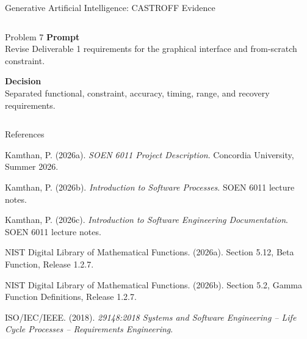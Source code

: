 \documentclass[aspectratio=169,10pt]{beamer}
\begin{document}
\begin{frame}[t]{Generative Artificial Intelligence: CASTROFF Evidence}
\begin{columns}[T,onlytextwidth]
    \begin{block}{Problem 7}
      \scriptsize
      \textbf{Prompt}\\
      Revise Deliverable 1 requirements for the graphical interface and
      from-scratch constraint.

      \vspace{0.35em}
      \textbf{Decision}\\
      Separated functional, constraint, accuracy, timing, range, and recovery
      requirements.
    \end{block}
  \end{columns}
\end{frame}

\begin{frame}[t]{References}
  \vspace{0.4em}
  \footnotesize
  \begin{list}{}{\setlength{\leftmargin}{0pt}\setlength{\itemsep}{0.5em}}
    \item Kamthan, P. (2026a). \emph{SOEN 6011 Project Description}.
      Concordia University, Summer 2026.
    \item Kamthan, P. (2026b). \emph{Introduction to Software Processes}.
      SOEN 6011 lecture notes.
    \item Kamthan, P. (2026c). \emph{Introduction to Software Engineering
      Documentation}. SOEN 6011 lecture notes.
    \item NIST Digital Library of Mathematical Functions. (2026a).
      Section 5.12, Beta Function, Release 1.2.7.
    \item NIST Digital Library of Mathematical Functions. (2026b).
      Section 5.2, Gamma Function Definitions, Release 1.2.7.
    \item ISO/IEC/IEEE. (2018). \emph{29148:2018 Systems and Software
      Engineering -- Life Cycle Processes -- Requirements Engineering}.
  \end{list}
\end{frame}
\end{document}
